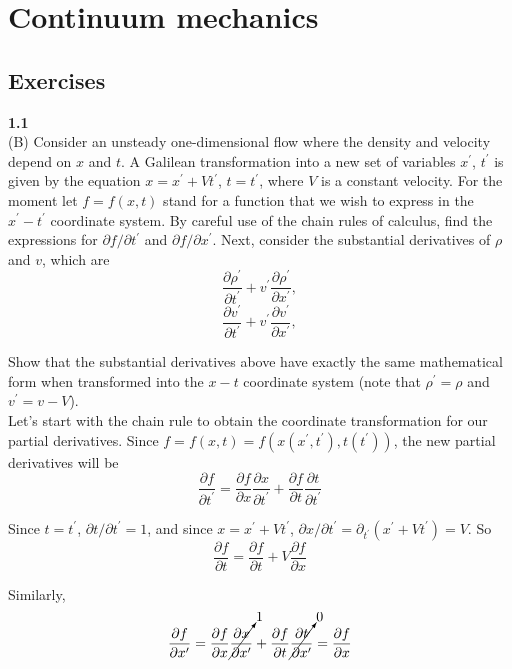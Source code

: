\section{Continuum mechanics}

\subsection{Exercises}

\textbf{1.1}
\\

(B) Consider an unsteady one-dimensional flow where the density and velocity depend on $x$ and $t$.
A Galilean transformation into a new set of variables $x^\prime$, $t^\prime$ is given by the equation $x = x^\prime + V t^\prime$,
$t = t^\prime$, where $V$ is a constant velocity.
For the moment let $f = f(x,t)$ stand for a function that we wish to express in the $x^{\prime}-t^{\prime}$ coordinate system.
By careful use of the chain rules of calculus, find the expressions for $\partial f / \partial t^\prime$ and $\partial f / \partial x^\prime$.
Next, consider the substantial derivatives of $\rho$ and $v$, which are
$$
\frac{\partial \rho^\prime}{\partial t^\prime} + v^\prime \frac{\partial \rho^\prime}{\partial x^\prime},
$$
$$
\frac{\partial v^\prime}{\partial t^\prime} + v^\prime \frac{\partial v^\prime}{\partial x^\prime},
$$

Show that the substantial derivatives above have exactly the same mathematical form when transformed into the $x-t$ coordinate system
(note that $\rho^\prime = \rho$ and $v^\prime = v - V$).
\\

Let's start with the chain rule to obtain the coordinate transformation for our partial derivatives.
Since $f = f(x,t) = f \left(x(x^\prime, t^\prime), t(t^\prime)\right)$, the new partial derivatives will be
$$
\frac{\partial f}{\partial t^\prime} = 
    \frac{\partial f}{\partial x}\frac{\partial x}{\partial t^\prime} +
    \frac{\partial f}{\partial t}\frac{\partial t}{\partial t^\prime}
$$

Since $t = t^\prime$, $\partial t / \partial t^\prime = 1$, and since $x = x^\prime + V t^\prime$,
$\partial x / \partial t^\prime = \partial_{t^\prime} \left( x^\prime + V t^\prime \right) = V$.
So
$$
\frac{\partial f}{\partial t} =
    \frac{\partial f}{\partial t} +
    V \frac{\partial f}{\partial x}
$$

Similarly,
$$
\frac{\partial f}{\partial x^\prime} = 
    \frac{\partial f}{\partial x} \cancelto{1}{ \frac{\partial x}{\partial x^\prime} } +
    \frac{\partial f}{\partial t} \cancelto{0}{ \frac{\partial t}{\partial x^\prime} }
= \frac{\partial f}{\partial x}
$$


